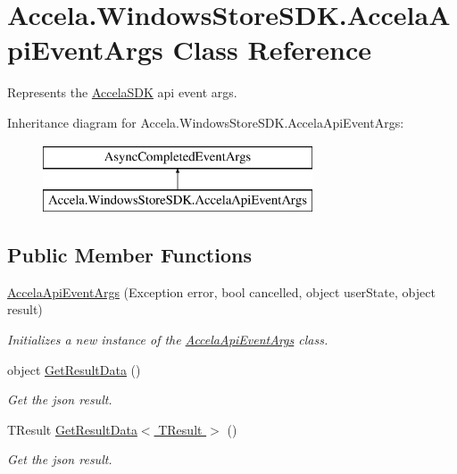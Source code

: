 \hypertarget{class_accela_1_1_windows_store_s_d_k_1_1_accela_api_event_args}{\section{Accela.\+Windows\+Store\+S\+D\+K.\+Accela\+Api\+Event\+Args Class Reference}
\label{class_accela_1_1_windows_store_s_d_k_1_1_accela_api_event_args}
}


Represents the \hyperlink{class_accela_1_1_windows_store_s_d_k_1_1_accela_s_d_k}{Accela\+S\+D\+K} api event args.  


Inheritance diagram for Accela.\+Windows\+Store\+S\+D\+K.\+Accela\+Api\+Event\+Args\+:\begin{figure}[H]
\begin{center}
\leavevmode
\includegraphics[height=2.000000cm]{class_accela_1_1_windows_store_s_d_k_1_1_accela_api_event_args}
\end{center}
\end{figure}
\subsection*{Public Member Functions}
\begin{DoxyCompactItemize}
\item 
\hyperlink{class_accela_1_1_windows_store_s_d_k_1_1_accela_api_event_args_a73d6ca4d2f3e3428cb857abefe897ae5}{Accela\+Api\+Event\+Args} (Exception error, bool cancelled, object user\+State, object result)
\begin{DoxyCompactList}\small\item\em Initializes a new instance of the \hyperlink{class_accela_1_1_windows_store_s_d_k_1_1_accela_api_event_args}{Accela\+Api\+Event\+Args} class. \end{DoxyCompactList}\item 
object \hyperlink{class_accela_1_1_windows_store_s_d_k_1_1_accela_api_event_args_aa5c2c66d7f14cd7c0bf3d58482d6f8a0}{Get\+Result\+Data} ()
\begin{DoxyCompactList}\small\item\em Get the json result. \end{DoxyCompactList}\item 
T\+Result \hyperlink{class_accela_1_1_windows_store_s_d_k_1_1_accela_api_event_args_a34f43b18c8587abd17e3b611e5f6853f}{Get\+Result\+Data$<$ T\+Result $>$} ()
\begin{DoxyCompactList}\small\item\em Get the json result. \end{DoxyCompactList}\end{DoxyCompactItemize}


